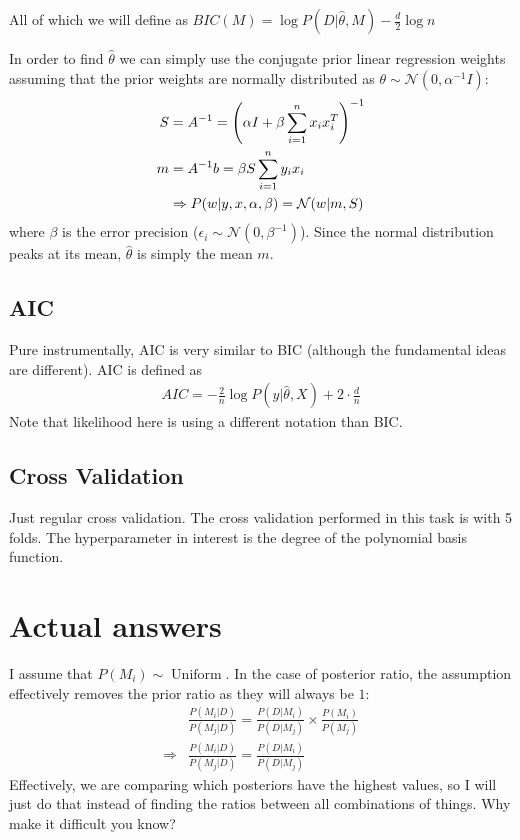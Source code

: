 \documentclass[12pt]{article}
\begin{document}
    \noindent All of which we will define as $BIC(M) = \log P(D|\hat{\theta},M) - \frac{d}{2} \log n$

    \noindent In order to find $\hat{\theta}$ we can simply use the conjugate prior linear regression weights assuming that the prior weights are normally distributed as $\theta \sim \mathcal{N}(0,\alpha^{-1} I)$:
    \begin{align}
        S &= A^{-1} = \left(\alpha I + \beta \sum\limits_{i=1}^{n} x_i x_i^T\right)^{-1} \\
        m &= A^{-1} b = \beta S \sum\limits_{i=1}^{n} y_i x_i \\ 
        &\Rightarrow P(w|y,x,\alpha,\beta) = \mathcal{N}(w|m,S)
    \end{align}
    where $\beta$ is the error precision ($\epsilon_i \sim \mathcal{N}(0, \beta^{-1})$). Since the normal distribution peaks at its mean, $\hat{\theta}$ is simply the mean $m$. 

    \subsection*{AIC}
    Pure instrumentally, AIC is very similar to BIC (although the fundamental ideas are different). AIC is defined as 
    \begin{align}
        AIC = -\frac{2}{n} \log  P(y|\hat{\theta},X) + 2 \cdot \frac{d}{n}
    \end{align}
    Note that likelihood here is using a different notation than BIC. 

    \subsection*{Cross Validation}
    Just regular cross validation. The cross validation performed in this task is with 5 folds. The hyperparameter in interest is the degree of the polynomial basis function. 

\section{Actual answers}
I assume that $P(M_i) \sim \operatorname{Uniform}$. In the case of posterior ratio, the assumption effectively removes the prior ratio as they will always be $1$:
    \begin{align}
        &\frac{P(M_i|D)}{P(M_j|D)} = \frac{P(D|M_i)}{P(D|M_j)} \times \frac{P(M_i)}{P(M_j)} \\
        \Rightarrow &\frac{P(M_i|D)}{P(M_j|D)} = \frac{P(D|M_i)}{P(D|M_j)}
    \end{align}
Effectively, we are comparing which posteriors have the highest values, so I will just do that instead of finding the ratios between all combinations of things. Why make it difficult you know?
\end{document}
